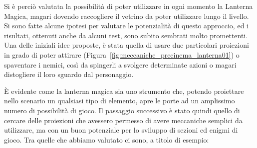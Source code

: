 Si è perciò valutata la possibilità di poter utilizzare in ogni momento la Lanterna Magica, magari dovendo raccogliere il vetrino da poter utilizzare lungo il livello. Si sono fatte alcune ipotesi per valutare le potenzialità di questo approccio, ed i risultati, ottenuti anche da alcuni test, sono subito sembrati molto promettenti.
Una delle iniziali idee proposte, è stata quella di usare due particolari proiezioni in grado di poter attirare (Figura~\ref{fig:meccaniche_precinema_lanterna01}) o spaventare i nemici, così da spingerli a svolgere determinate azioni o magari distogliere il loro sguardo dal personaggio.

È evidente come la lanterna magica sia uno strumento che, potendo proiettare nello scenario un qualsiasi tipo di elemento, apre le porte ad un amplissimo numero di possibilità di gioco.
Il passaggio successivo è stato quindi quello di cercare delle proiezioni che avessero permesso di avere meccaniche semplici da utilizzare, ma con un buon potenziale per lo sviluppo di sezioni ed enigmi di gioco. Tra quelle che abbiamo valutato ci sono, a titolo di esempio:

